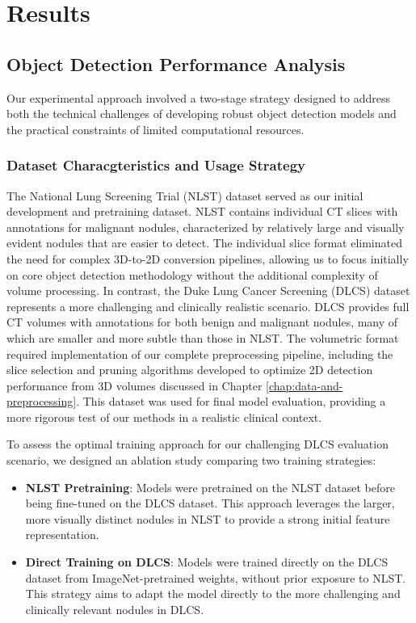 \chapter{Results}
\label{chap:results}
\section{Object Detection Performance Analysis}

Our experimental approach involved a two-stage strategy designed to address both the technical challenges of developing robust object detection models and the practical constraints of limited computational resources.

\subsection{Dataset Characgteristics and Usage Strategy}
The National Lung Screening Trial (NLST) dataset served as our initial development and pretraining dataset. NLST contains individual CT slices with annotations for malignant nodules, characterized by relatively large and visually evident nodules that are easier to detect. The individual slice format eliminated the need for complex 3D-to-2D conversion pipelines, allowing us to focus initially on core object detection methodology without the additional complexity of volume processing.
In contrast, the Duke Lung Cancer Screening (DLCS) dataset represents a more challenging and clinically realistic scenario. DLCS provides full CT volumes with annotations for both benign and malignant nodules, many of which are smaller and more subtle than those in NLST. The volumetric format required implementation of our complete preprocessing pipeline, including the slice selection and pruning algorithms developed to optimize 2D detection performance from 3D volumes discussed in Chapter \ref{chap:data-and-preprocessing}. This dataset was used for final model evaluation, providing a more rigorous test of our methods in a realistic clinical context.

To assess the optimal training approach for our challenging DLCS evaluation scenario, we designed an ablation study comparing two training strategies:
\begin{itemize}
    \item \textbf{NLST Pretraining}: Models were pretrained on the NLST dataset before being fine-tuned on the DLCS dataset. This approach leverages the larger, more visually distinct nodules in NLST to provide a strong initial feature representation.
    \item \textbf{Direct Training on DLCS}: Models were trained directly on the DLCS dataset from ImageNet-pretrained weights, without prior exposure to NLST. This strategy aims to adapt the model directly to the more challenging and clinically relevant nodules in DLCS.
\end{itemize}

